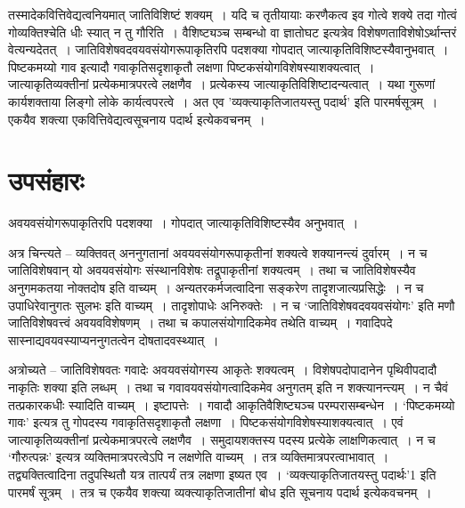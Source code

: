 		\begin{small}

			तस्मादेकवित्तिवेद्यत्वनियमात् जातिविशिष्टं शक्यम्~। यदि च तृतीयायाः करणैकत्व इव गोत्वे शक्ये तदा गोत्वं गोव्यक्तिश्चेति धीः स्यात् न तु गौरिति~। वैशिष्ट्यञ्च सम्बन्धो वा ज्ञातोघट इत्यत्रेव विशेषणताविशेषोऽर्थान्तरं वेत्यन्यदेतत्~। जातिविशेषवदवयवसंयोगरूपाकृतिरपि पदशक्या गोपदात् जात्याकृतिविशिष्टस्यैवानुभवात्~। पिष्टकमय्यो गाव इत्यादौ गवाकृतिसदृशाकृतौ लक्षणा पिष्टकसंयोगविशेषस्याशक्यत्वात्~। जात्याकृतिव्यक्तीनां प्रत्येकमात्रपरत्वे लक्षणैव~। प्रत्येकस्य जात्याकृतिविशिष्टादन्यत्वात्~। यथा गुरूणां कार्यशक्ताया लिङ्गो लोके कार्यत्वपरत्वे~। अत एव ’व्यक्त्याकृतिजातयस्तु पदार्थ’ इति पारमर्षसूत्रम्~। एकयैव शक्त्या एकवित्तिवेद्यत्वसूचनाय पदार्थ इत्येकवचनम्~। 
		\end{small}

\chapter{उपसंहारः}
	
	अवयवसंयोगरूपाकृतिरपि पदशक्या~। गोपदात् जात्याकृतिविशिष्टस्यैव अनुभवात्~। 

	अत्र चिन्त्यते – व्यक्तिवत् अननुगतानां अवयवसंयोगरूपाकृतीनां शक्यत्वे शक्यानन्त्यं दुर्वारम्~। न च जातिविशेषवान् यो अवयवसंयोगः संस्थानविशेषः तद्रूपाकृतीनां शक्यत्वम्~। तथा च जातिविशेषस्यैव अनुगमकतया नोक्तदोष इति वाच्यम्~। अन्यतरकर्मजत्वादिना सङ्करेण तादृशजात्यप्रसिद्धेः~। न च उपाधिरेवानुगतः सुलभः इति वाच्यम्~। तादृशोपाधेः अनिरुक्तेः~। न च ‘जातिविशेषवदवयवसंयोगः’ इति मणौ जातिविशेषवत्त्वं अवयवविशेषणम्~। तथा च कपालसंयोगादिकमेव तथेति वाच्यम्~। गवादिपदे सास्नाद्यवयवस्याप्यननुगतत्वेन दोषतादवस्थ्यात्~। 

	अत्रोच्यते – जातिविशेषवतः गवादेः अवयवसंयोगस्य आकृतेः शक्यत्वम्~। विशेषपदोपादानेन पृथिवीपदादौ नाकृतिः शक्या इति लब्धम्~। तथा च गवावयवसंयोगत्वादिकमेव अनुगतम् इति न शक्त्यानन्त्यम्~। न चैवं तत्प्रकारकधीः स्यादिति वाच्यम्~। इष्टापत्तेः~। गवादौ आकृतिवैशिष्ट्यञ्च परम्परासम्बन्धेन~। ‘पिष्टकमय्यो गावः’ इत्यत्र तु गोपदस्य गवाकृतिसदृशाकृतौ लक्षणा~। पिष्टकसंयोगविशेषस्याशक्यत्वात्~। एवं जात्याकृतिव्यक्तीनां प्रत्येकमात्रपरत्वे लक्षणैव~। समुदायशक्तस्य पदस्य प्रत्येके लाक्षणिकत्वात्~। न च ‘गौरुत्पन्नः’ इत्यत्र व्यक्तिमात्रपरत्वेऽपि न लक्षणेति वाच्यम्~। तत्र व्यक्तिमात्रपरत्वाभावात्~। तद्व्यक्तित्वादिना तदुपस्थितौ यत्र तात्पर्यं तत्र लक्षणा इष्यत एव~। ‘व्यक्त्याकृतिजातयस्तु पदार्थः’1 इति पारमर्षं सूत्रम्~। तत्र च एकयैव शक्त्या व्यक्त्याकृतिजातीनां बोध इति सूचनाय पदार्थ इत्येकवचनम्~।


